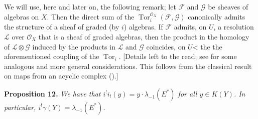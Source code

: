 \documentclass{article}
\newenvironment{itenv}[1]
  {\phantomsection\par\medskip\noindent\textbf{#1.}\itshape}
  {\medskip}
\newcommand{\scr}[1]{{\mathscr{#1}}}
\DeclareMathOperator{\Tor}{Tor}
\begin{document}
\subsection{}
\label{subsection10d}

We will use, here and later on, the following remark;
let $\scr{F}$ and $\scr{G}$ be sheaves of algebras on $X$.
Then the direct sum of the $\Tor_i^{\scr{O}_X}(\scr{F},\scr{G})$ canonically admits the structure of a sheaf of graded (by $i$) algebras.
If $\scr{F}$ admits, on $U$, a resolution $\scr{L}$ over $\scr{O}_X$ that is a sheaf of graded algebras, then the product in the homology of $\scr{L}\otimes\scr{G}$ induced by the products in $\scr{L}$ and $\scr{G}$ coincides, on $U$< the the aforementioned coupling of the $\Tor_i$.
[Details left to the read;
see \cite[chap.~IX]{3} for some analogous and more general considerations.
This follows from the classical result on maps from an acyclic complex (\cite[proposition~11, p.~76]{3}).]

\begin{itenv}{Proposition 12}
\label{proposition12}
  We have that $i^!i_!(y)=y\cdot\lambda_{-1}(E^*)$ for all $y\in K(Y)$.
  In particular, $i^!\gamma(Y)=\lambda_{-1}(E^*)$.
\end{itenv}
\end{document}
